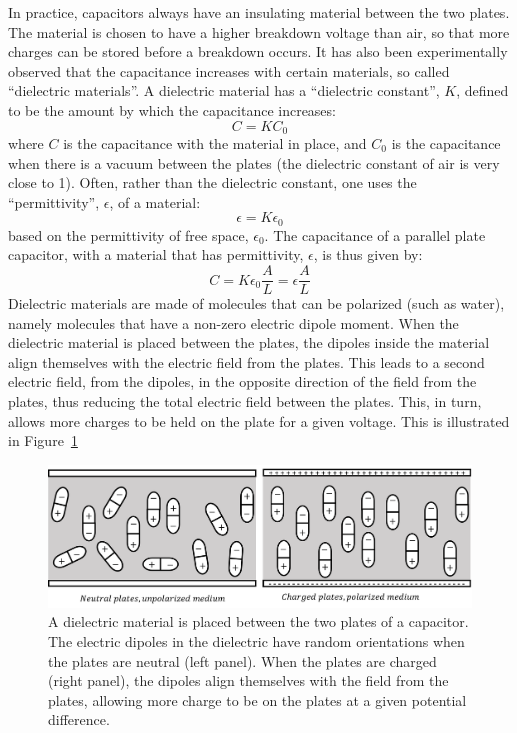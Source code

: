 In practice, capacitors always have an insulating material between the two plates. The material is chosen to have a higher breakdown voltage than air, so that more charges can be stored before a breakdown occurs. It has also been experimentally observed that the capacitance increases with certain materials, so called ``dielectric materials''. A dielectric material has a ``dielectric constant'', $K$, defined to be the amount by which the capacitance increases:
\begin{equation}
C=KC_0
\end{equation}
where $C$ is the capacitance with the material in place, and $C_0$ is the capacitance when there is a vacuum between the plates (the dielectric constant of air is very close to 1). Often, rather than the dielectric constant, one uses the ``permittivity'', $\epsilon$, of a material:
\begin{equation}
\epsilon=K\epsilon_0
\end{equation}
based on the permittivity of free space, $\epsilon_0$. The capacitance of a parallel plate capacitor, with a material that has permittivity, $\epsilon$, is thus given by:
\begin{equation}
C=K\epsilon_0\frac{A}{L}=\epsilon\frac{A}{L}
\end{equation}
Dielectric materials are made of molecules that can be polarized (such as water), namely molecules that have a non-zero electric dipole moment. When the dielectric material is placed between the plates, the dipoles inside the material align themselves with the electric field from the plates. This leads to a second electric field, from the dipoles, in the opposite direction of the field from the plates, thus reducing the total electric field between the plates. This, in turn, allows more charges to be held on the plate for a given voltage. This is illustrated in Figure~\ref{fig:potential:polarizeddipoles}

\begin{figure}[!htbp]
\centering
\includegraphics[width=0.8\linewidth]{files/polarizeddipoles-e5ce4de56894724c087e06f93a23086e.png}
\caption[]{A dielectric material is placed between the two plates of a capacitor. The electric dipoles in the dielectric have random orientations when the plates are neutral (left panel). When the plates are charged (right panel), the dipoles align themselves with the field from the plates, allowing more charge to be on the plates at a given potential difference.}
\label{fig:potential:polarizeddipoles}
\end{figure}

